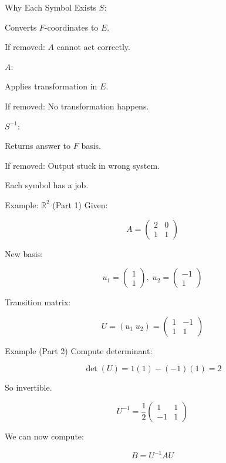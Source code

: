 \documentclass[landscape]{beamer}
\begin{document}
\begin{frame}{Why Each Symbol Exists}
$S$:

Converts $F$-coordinates to $E$.

If removed:
$A$ cannot act correctly.

$A$:

Applies transformation in $E$.

If removed:
No transformation happens.

$S^{-1}$:

Returns answer to $F$ basis.

If removed:
Output stuck in wrong system.

Each symbol has a job.
\end{frame}

\begin{frame}{Example: $\mathbb{R}^2$ (Part 1)}
Given:

\[
A=\begin{pmatrix}
2 & 0\\
1 & 1
\end{pmatrix}
\]

New basis:

\[
u_1=\begin{pmatrix}1\\1\end{pmatrix},\;
u_2=\begin{pmatrix}-1\\1\end{pmatrix}
\]

Transition matrix:

\[
U=(u_1\;u_2)
=
\begin{pmatrix}
1 & -1\\
1 & 1
\end{pmatrix}
\]

\end{frame}

\begin{frame}{Example (Part 2)}
Compute determinant:

\[
\det(U)=1(1)-(-1)(1)=2
\]

So invertible.

\[
U^{-1}
=
\frac{1}{2}
\begin{pmatrix}
1 & 1\\
-1 & 1
\end{pmatrix}
\]

We can now compute:

\[
B=U^{-1}AU
\]

\end{frame}
\end{document}
